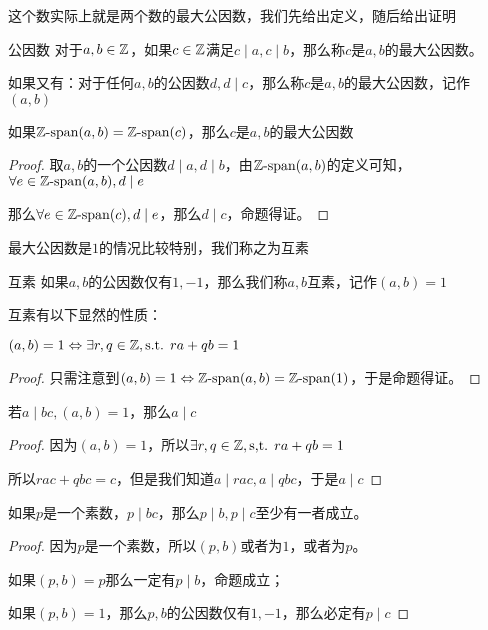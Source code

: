 \documentclass[12pt, a4paper, oneside, UTF8]{ctexbook}
\begin{document}
			这个数实际上就是两个数的最大公因数，我们先给出定义，随后给出证明
			\begin{defn}{公因数}
				对于$a,b \in \mathbb{Z}$，如果$c\in\mathbb{Z}$满足$c\mid a,c\mid b$，那么称$c$是$a,b$的最大公因数。
				
				如果又有：对于任何$a,b$的公因数$d,d \mid c$，那么称$c$是$a,b$的最大公因数，记作$(a,b)$
			\end{defn}
			\begin{lemma}{}{}
				如果$\mathbb{Z}\text{-span}(a,b)=\mathbb{Z}\text{-span}(c)$，那么$c$是$a,b$的最大公因数
			\end{lemma}
			\begin{proof}
				取$a,b$的一个公因数$d\mid a,d\mid b$，由$\mathbb{Z}\text{-span}(a,b)$的定义可知，$\forall e \in \mathbb{Z}\text{-span}(a,b),d \mid e$
				
				那么$\forall e \in \mathbb{Z}\text{-span}(c),d \mid e$，那么$d \mid c$，命题得证。
			\end{proof}
			最大公因数是$1$的情况比较特别，我们称之为互素
			\begin{defn}{互素}{}
				如果$a,b$的公因数仅有$1,-1$，那么我们称$a,b$互素，记作$(a,b)=1$
			\end{defn}
			互素有以下显然的性质：
			\begin{lemma}{}{}
				$(a,b)=1 \Leftrightarrow \exists r,q \in \mathbb{Z},\text{s.t. }ra+qb=1$
			\end{lemma}
			\begin{proof}
				只需注意到$(a,b)=1 \Leftrightarrow \mathbb{Z}\text{-span}(a,b)=\mathbb{Z}\text{-span}(1)$，于是命题得证。
			\end{proof}
			\begin{lemma}{}{}
				若$a \mid bc,(a,b)=1$，那么$a\mid c$
			\end{lemma}
			\begin{proof}
				因为$(a,b)=1$，所以$\exists r,q\in \mathbb{Z},\text{s,t. }ra+qb=1$
				
				所以$rac+qbc=c$，但是我们知道$a\mid rac,a\mid qbc$，于是$a\mid c$
			\end{proof}
			\begin{lemma}{}{}
				如果$p$是一个素数，$p \mid bc$，那么$p \mid b,p\mid c$至少有一者成立。
			\end{lemma}
			\begin{proof}
				因为$p$是一个素数，所以$(p,b)$或者为$1$，或者为$p$。
				
				如果$(p,b)=p$那么一定有$p \mid b$，命题成立；
				
				如果$(p,b)=1$，那么$p,b$的公因数仅有$1,-1$，那么必定有$p \mid c$
			\end{proof}
\end{document}
